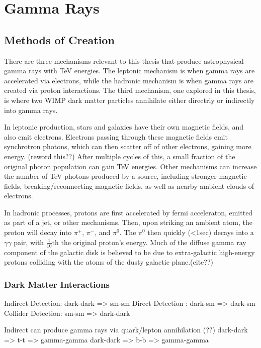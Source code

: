 \cleartooddpage[\thispagestyle{empty}]
\chapter{Gamma Rays}


\section{Methods of Creation}

There are three mechanisms relevant to this thesis that produce astrophysical gamma rays with TeV energies.
The leptonic mechanism is when gamma rays are accelerated via electrons, while the hadronic mechanism is when gamma rays are created via proton interactions.
The third mechanism, one explored in this thesis, is where two WIMP dark matter particles annihilate either directrly or indirectly into gamma rays.

In leptonic production, stars and galaxies have their own magnetic fields, and also emit electrons.
Electrons passing through these magnetic fields emit synchrotron photons, which can then scatter off of other electrons, gaining more energy. (reword this??)
After multiple cycles of this, a small fraction of the original photon population can gain TeV energies.
Other mechanisms can increase the number of TeV photons produced by a source, including stronger magnetic fields, breaking/reconnecting magnetic fields, as well as nearby ambient clouds of electrons.

In hadronic processes, protons are first accelerated by fermi acceleraton, emitted as part of a jet, or other mechanisms.
Then, upon striking an ambient atom, the proton will decay into $\pi^{+}$, $\pi^{-}$, and $\pi^{0}$.
The $\pi^{0}$ then quickly (<1sec) decays into a $\gamma\gamma$ pair, with \nicetilde $\frac{1}{10}$th the original proton's energy.
Much of the diffuse gamma ray component of the galactic disk is believed to be due to extra-galactic high-energy protons colliding with the atoms of the dusty galactic plane.(cite??)


\subsection{Dark Matter Interactions}
Indirect Detection: dark-dark => sm-sm
Direct Detection  : dark-sm => dark-sm
Collider Detection: sm-sm => dark-dark

Indirect can produce gamma rays via quark/lepton annihilation (??)
dark-dark => t-t => gamma-gamma
dark-dark => b-b => gamma-gamma


